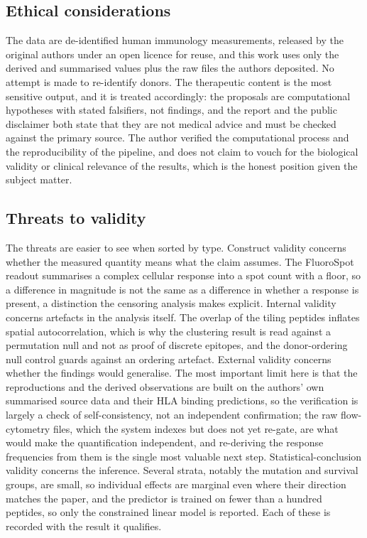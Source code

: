 \documentclass[11pt]{article}
\begin{document}
\subsection{Ethical considerations}
The data are de-identified human immunology measurements, released by the original authors under an
open licence for reuse, and this work uses only the derived and summarised values plus the raw files
the authors deposited. No attempt is made to re-identify donors. The therapeutic content is the most
sensitive output, and it is treated accordingly: the proposals are computational hypotheses with
stated falsifiers, not findings, and the report and the public disclaimer both state that they are not
medical advice and must be checked against the primary source. The author verified the computational
process and the reproducibility of the pipeline, and does not claim to vouch for the biological
validity or clinical relevance of the results, which is the honest position given the subject matter.

\subsection{Threats to validity}
The threats are easier to see when sorted by type. Construct validity concerns whether the measured
quantity means what the claim assumes. The FluoroSpot readout summarises a complex cellular response
into a spot count with a floor, so a difference in magnitude is not the same as a difference in
whether a response is present, a distinction the censoring analysis makes explicit. Internal validity
concerns artefacts in the analysis itself. The overlap of the tiling peptides inflates spatial
autocorrelation, which is why the clustering result is read against a permutation null and not as
proof of discrete epitopes, and the donor-ordering null control guards against an ordering artefact.
External validity concerns whether the findings would generalise. The most important limit here is
that the reproductions and the derived observations are built on the authors' own summarised source
data and their HLA binding predictions, so the verification is largely a check of self-consistency,
not an independent confirmation; the raw flow-cytometry files, which the system indexes but does not
yet re-gate, are what would make the quantification independent, and re-deriving the response
frequencies from them is the single most valuable next step. Statistical-conclusion validity concerns
the inference. Several strata, notably the mutation and survival groups, are small, so individual
effects are marginal even where their direction matches the paper, and the predictor is trained on
fewer than a hundred peptides, so only the constrained linear model is reported. Each of these is
recorded with the result it qualifies.
\end{document}
